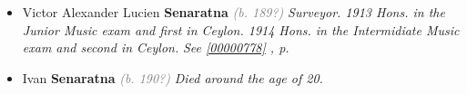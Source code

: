 \documentclass[10pt, openany]{book}
\begin{document}
\begin{itemize}
{\begin{itemize}
{\begin{itemize}
{\begin{itemize}
{\begin{itemize}
\item{\textit{m.} Joan \textbf{Unknown} \textcolor{gray}{\textit{(b. 193?)}} \textcolor{slmaroon}{\textit{English.}}   \label{couple:00000153:00000883} \begin{itemize}
\item{Rene \textbf{De Silva} \textcolor{gray}{\textit{(b. 196?)}} \textcolor{slmaroon}{\textit{Lawyer.
In England.}}
  }
\end{itemize}}
\end{itemize}
  }
\item{Carmel \textbf{De Silva} \textcolor{gray}{\textit{(b. 192?)}} \textcolor{slmaroon}{\textit{Music \& Montesorri Teacher.}}
  }
\end{itemize}}
\end{itemize}
 }
\item{Victor Alexander Lucien \textbf{Senaratna} \textcolor{gray}{\textit{(b. 189?)}} \textcolor{slmaroon}{\textit{Surveyor.
1913 Hons. in the Junior Music exam and first in Ceylon. 1914 Hons. in the Intermidiate Music exam and second in Ceylon.}} \textcolor{slteal}{\textit{See  \autoref{00000778} \textit{, p. \pageref{00000778} }}}}
\item{Ivan \textbf{Senaratna} \textcolor{gray}{\textit{(b. 190?)}} \textcolor{slmaroon}{\textit{Died around the age of 20.}}
 }
\end{itemize}}
\end{itemize}
 
\end{document}
